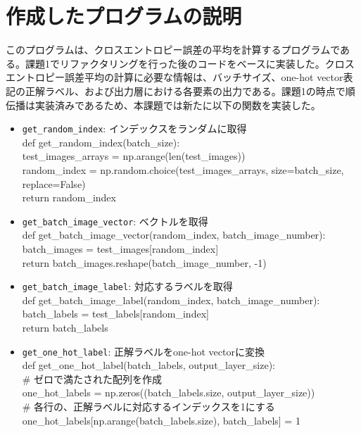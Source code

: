 \documentclass[11px,a4paper]{jsarticle}
\begin{document}
\section{作成したプログラムの説明}
このプログラムは、クロスエントロピー誤差の平均を計算するプログラムである。課題1でリファクタリングを行った後のコードをベースに実装した。クロスエントロピー誤差平均の計算に必要な情報は、バッチサイズ、one-hot vector表記の正解ラベル、および出力層における各要素の出力である。課題1の時点で順伝播は実装済みであるため、本課題では新たに以下の関数を実装した。
\begin{itemize}
    \item \verb|get_random_index|: インデックスをランダムに取得\\
    def get\_random\_index(batch\_size):\\
    test\_images\_arrays = np.arange(len(test\_images))\\
    random\_index = np.random.choice(test\_images\_arrays, size=batch\_size, replace=False)\\
    return random\_index\\
    \item \verb|get_batch_image_vector|: ベクトルを取得\\
    def get\_batch\_image\_vector(random\_index, batch\_image\_number): \\
    batch\_images = test\_images[random\_index]\\
    return batch\_images.reshape(batch\_image\_number, -1)\\
    \item \verb|get_batch_image_label|: 対応するラベルを取得\\
    def get\_batch\_image\_label(random\_index, batch\_image\_number):\\
    batch\_labels = test\_labels[random\_index]\\
    return batch\_labels\\
    \item \verb|get_one_hot_label|: 正解ラベルをone-hot vectorに変換\\
    def get\_one\_hot\_label(batch\_labels, output\_layer\_size):\\
    \# ゼロで満たされた配列を作成\\
    one\_hot\_labels = np.zeros((batch\_labels.size, output\_layer\_size)) \\
    \# 各行の、正解ラベルに対応するインデックスを1にする\\
    one\_hot\_labels[np.arange(batch\_labels.size), batch\_labels] = 1 \\

\end{itemize}
\end{document}
